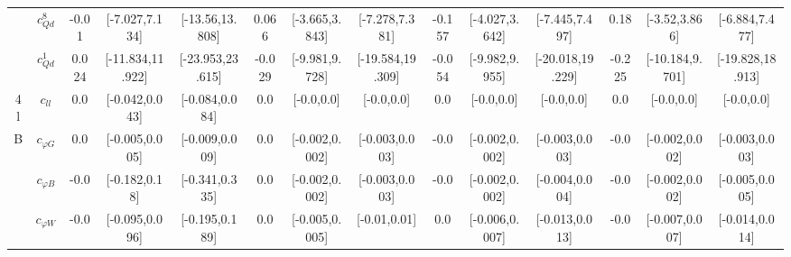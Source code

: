 \documentclass{article}
\begin{document}
\begin{table}[H]
\begin{tabular}{|c|c|c|c|c|c|c|c|c|c|c|c|c|c|}
 & $c_{Qd}^{8}$ & -0.01                             & [-7.027,7.134]                                 & [-13.56,13.808] & 0.066                             & [-3.665,3.843]                                 & [-7.278,7.381] & -0.157                             & [-4.027,3.642]                                 & [-7.445,7.497] & 0.18                             & [-3.52,3.866]                                 & [-6.884,7.477] \\ \cline{2-14}
 & $c_{Qd}^{1}$ & 0.024                             & [-11.834,11.922]                                 & [-23.953,23.615] & -0.029                             & [-9.981,9.728]                                 & [-19.584,19.309] & -0.054                             & [-9.982,9.955]                                 & [-20.018,19.229] & -0.225                             & [-10.184,9.701]                                 & [-19.828,18.913] \\ \cline{2-14}
\hline
\multirow{1}{*}{4l}
 & $c_{ll}$ & 0.0                             & [-0.042,0.043]                                 & [-0.084,0.084] & 0.0                             & [-0.0,0.0]                                 & [-0.0,0.0] & 0.0                             & [-0.0,0.0]                                 & [-0.0,0.0] & 0.0                             & [-0.0,0.0]                                 & [-0.0,0.0] \\ \cline{2-14}
\hline
\multirow{7}{*}{B}
 & $c_{\varphi G}$ & 0.0                             & [-0.005,0.005]                                 & [-0.009,0.009] & 0.0                             & [-0.002,0.002]                                 & [-0.003,0.003] & -0.0                             & [-0.002,0.002]                                 & [-0.003,0.003] & -0.0                             & [-0.002,0.002]                                 & [-0.003,0.003] \\ \cline{2-14}
 & $c_{\varphi B}$ & -0.0                             & [-0.182,0.18]                                 & [-0.341,0.335] & 0.0                             & [-0.002,0.002]                                 & [-0.003,0.003] & -0.0                             & [-0.002,0.002]                                 & [-0.004,0.004] & -0.0                             & [-0.002,0.002]                                 & [-0.005,0.005] \\ \cline{2-14}
 & $c_{\varphi W}$ & -0.0                             & [-0.095,0.096]                                 & [-0.195,0.189] & 0.0                             & [-0.005,0.005]                                 & [-0.01,0.01] & 0.0                             & [-0.006,0.007]                                 & [-0.013,0.013] & -0.0                             & [-0.007,0.007]                                 & [-0.014,0.014] \\ \cline{2-14}

\end{tabular}
\end{table}
\end{document}
